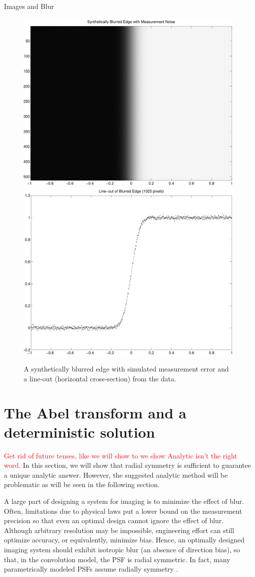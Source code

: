 \begin{chapter}{Images and Blur}
\begin{figure}
\begin{center}
  \includegraphics[width=.45\textwidth]{figures/blurredEdgeData.pdf}
  \includegraphics[width=.45\textwidth]{figures/psfLineoutData.pdf}
  \caption{A synthetically blurred edge with simulated measurement error and a line-out (horizontal cross-section) from the data.} \label{fig:edgeData}
\end{center}
\end{figure}
  
\section{The Abel transform and a deterministic solution}
\textcolor{red}{
Get rid of future tenses, like we will show to we show
Analytic isn't the right word.
}
  In this section, we will show that radial symmetry is sufficient to guarantee a unique analytic answer.
  However, the suggested analytic method will be problematic as will be seen in the following section.

  A large part of designing a system for imaging is to minimize the effect of blur.
  Often, limitations due to physical laws put a lower bound on the measurement precision so that even an optimal design cannot ignore the effect of blur.
  Although arbitrary resolution may be impossible, engineering effort can still optimize accuracy, or equivalently, minimize bias.
  Hence, an optimally designed imaging system should exhibit isotropic blur (an absence of direction bias), so that, in the convolution model, the PSF is radial symmetric.
  In fact, many parametrically modeled PSFs assume radially symmetry \citep{doering1992,jain1989,kundur1996blind,watson1993}.  


\end{chapter}
